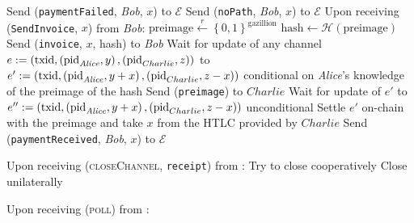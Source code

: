 \begin{algorithmic}[1]
        \Else
          \State Send (\texttt{paymentFailed}, \textit{Bob}, $x$) to $\mathcal{E}$
        \EndIf
      \Else {}
        \State Send (\texttt{noPath}, \textit{Bob}, $x$) to $\mathcal{E}$
      \EndIf
    \State
    \State Upon receiving (\texttt{SendInvoice}, $x$) from \textit{Bob}:
      \State $\mathrm{preimage} \overset{r}{\gets}
      \left\{0,1\right\}^{\mathrm{gazillion}}$
      \State $\mathrm{hash} \gets \mathcal{H}\left(\mathrm{preimage}\right)$
      \State Send (\texttt{invoice}, $x$, hash) to \textit{Bob}
      \State Wait for update of any channel $e := \left(\mathrm{txid},
      \left(\mathrm{pid}_{\mathit{Alice}}, y\right), \left(\mathrm{pid}_{Charlie},
      z\right)\right)$ to $e' := \left(\mathrm{txid},
      \left(\mathrm{pid}_{\mathit{Alice}}, y + x\right), \left(\mathrm{pid}_{Charlie}, z
      - x\right)\right)$ conditional on \textit{Alice}'s knowledge of the preimage of
      the hash
      \State Send (\texttt{preimage}) to $Charlie$
      \State Wait for update of $e'$ to $e'' := \left(\mathrm{txid},
      \left(\mathrm{pid}_{\mathit{Alice}}, y + x\right), \left(\mathrm{pid}_{Charlie}, z
      - x\right)\right)$ unconditional
        \State Settle $e'$ on-chain with the preimage and take $x$ from the HTLC
        provided by $Charlie$
      \EndIf
      \State Send (\texttt{paymentReceived}, \textit{Bob}, $x$) to $\mathcal{E}$
    \State

    \State Upon receiving (\textsc{closeChannel}, \texttt{receipt}) from
    \environment: 
    \Indent
        \State Try to close cooperatively 
         
          \State Close unilaterally 
        \EndIf
      \EndIf
    \EndIndent
    \State

    \State Upon receiving (\textsc{poll}) from \environment:
    \Indent
      \State {}
    \EndIndent
  \end{algorithmic}
\hrulefill
